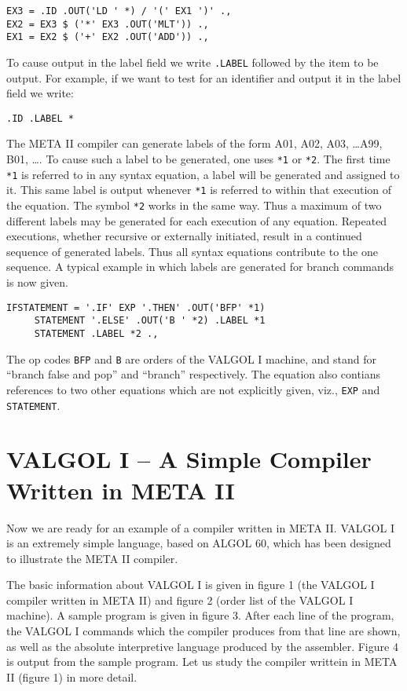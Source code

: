 \documentclass[notitlepage,twocolumn]{report}
\begin{document}
\begin{verbatim}
EX3 = .ID .OUT('LD ' *) / '(' EX1 ')' .,
EX2 = EX3 $ ('*' EX3 .OUT('MLT')) .,
EX1 = EX2 $ ('+' EX2 .OUT('ADD')) .,
\end{verbatim}

To cause output in the label field we write \texttt{.LABEL} followed
by the item to be output. For example, if we want to test for an
identifier and output it in the label field we write:

\begin{verbatim}
.ID .LABEL *
\end{verbatim}

The META II compiler can generate labels of the form A01, A02, A03,
\ldots A99, B01, \ldots. To cause such a label to be generated, one
uses \texttt{*1} or \texttt{*2}. The first time \texttt{*1} is
referred to in any syntax equation, a label will be generated and
assigned to it. This same label is output whenever \texttt{*1} is
referred to within that execution of the equation. The symbol
\texttt{*2} works in the same way. Thus a maximum of two different
labels may be generated for each execution of any equation. Repeated
executions, whether recursive or externally initiated, result in a
continued sequence of generated labels. Thus all syntax equations
contribute to the one sequence. A typical example in which labels are
generated for branch commands is now given.

\begin{verbatim}
IFSTATEMENT = '.IF' EXP '.THEN' .OUT('BFP' *1)
     STATEMENT '.ELSE' .OUT('B ' *2) .LABEL *1
     STATEMENT .LABEL *2 .,
\end{verbatim}

The op codes \texttt{BFP} and \texttt{B} are orders of the VALGOL I
machine, and stand for ``branch false and pop'' and ``branch''
respectively. The equation also contians references to two other
equations which are not explicitly given, viz., \texttt{EXP} and
\texttt{STATEMENT}.


\section*{VALGOL I -- A Simple Compiler Written in META II}

Now we are ready for an example of a compiler written in META
II. VALGOL I is an extremely simple language, based on ALGOL 60, which
has been designed to illustrate the META II compiler.

The basic information about VALGOL I is given in figure 1 (the VALGOL
I compiler written in META II) and figure 2 (order list of the VALGOL
I machine). A sample program is given in figure 3. After each line of
the program, the VALGOL I commands which the compiler produces from
that line are shown, as well as the absolute interpretive language
produced by the assembler. Figure 4 is output from the sample
program. Let us study the compiler writtein in META II (figure 1) in
more detail.
\end{document}
